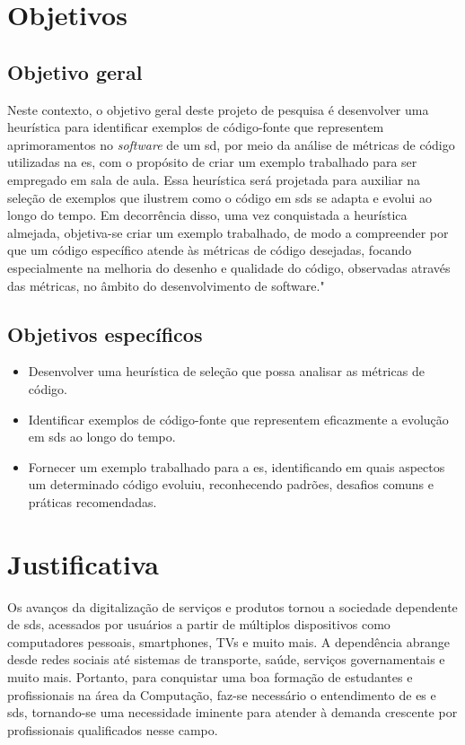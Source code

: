 \section{Objetivos}\label{sec:objetivos}
\subsection{Objetivo geral}\label{subsec:objetivoGeral}
Neste contexto, o objetivo geral deste projeto de pesquisa é desenvolver uma heurística para identificar exemplos de código-fonte que representem aprimoramentos no \textit{software} de um \gls{sd}, por meio da análise de métricas de código utilizadas na \gls{es}, com o propósito de criar um exemplo trabalhado para ser empregado em sala de aula. Essa heurística será projetada para auxiliar na seleção de exemplos que ilustrem como o código em \gls{sds} se adapta e evolui ao longo do tempo. Em decorrência disso, uma vez conquistada a heurística almejada, objetiva-se criar um exemplo trabalhado, de modo a compreender por que um código específico atende às métricas de código desejadas, focando especialmente na melhoria do desenho e qualidade do código, observadas através das métricas, no âmbito do desenvolvimento de software."

\subsection{Objetivos específicos}\label{subsec:objetivosEspecificos}
\begin{itemize}
    \item Desenvolver uma heurística de seleção que possa analisar as métricas de código.
    \item Identificar exemplos de código-fonte que representem eficazmente a evolução em \gls{sds} ao longo do tempo.
    \item Fornecer um exemplo trabalhado para a \gls{es}, identificando em quais aspectos um determinado código evoluiu, reconhecendo padrões, desafios comuns e práticas recomendadas.
\end{itemize}

\section{Justificativa}\label{sec:justificativa}
Os avanços da digitalização de serviços e produtos tornou a sociedade dependente de \gls{sds}, acessados por usuários a partir de múltiplos dispositivos como computadores pessoais, smartphones, TVs e muito mais. A dependência abrange desde redes sociais até sistemas de transporte, saúde, serviços governamentais e muito mais. Portanto, para conquistar uma boa formação de estudantes e profissionais na área da Computação, faz-se necessário o entendimento de \gls{es} e \gls{sds}, tornando-se uma necessidade iminente para atender à demanda crescente por profissionais qualificados nesse campo. 

